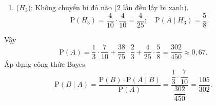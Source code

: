 \begin{ex}
{\begin{itemchoice}
\begin{enumerate}[\textbf{TH}.]
\begin{itemize}
				\end{itemize}
				\[ \mathrm{P}(H_2) = \dfrac{4}{15} + \dfrac{6}{25} = \dfrac{38}{75}. \]
				\[ \mathrm{P}\left(A\mid H_2\right) = \dfrac{5+1}{8+1} = \dfrac{2}{3}. \]
				\item ($H_3$): Không chuyển bi đỏ nào ($2$ lần đều lấy bi xanh).
				\[ \mathrm{P}(H_3) = \dfrac{4}{10} \cdot \dfrac{4}{10} = \dfrac{4}{25}; \quad \mathrm{P}\left(A\mid H_3\right) = \dfrac{5}{8}. \]
			\end{enumerate}
			Vậy \[ \mathrm{P}(A) = \dfrac{1}{3} \cdot \dfrac{7}{10} + \dfrac{38}{75} \cdot \dfrac{2}{3}+ \dfrac{4}{25} \cdot \dfrac{5}{8}= \dfrac{302}{450} \approx 0{,}67.\]
			\itemch Áp dụng công thức Bayes
			\[ \mathrm{P}\left(B\mid A\right) = \dfrac{\mathrm{P}(B) \cdot \mathrm{P}\left(A\mid B\right)}{\mathrm{P}(A)} = \dfrac{\dfrac{1}{3} \cdot \dfrac{7}{10}}{\dfrac{302}{450}} = \dfrac{105}{302}.\]
		\end{itemchoice}
	}
\end{ex}


